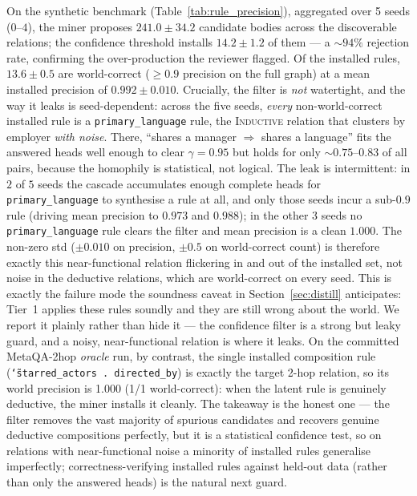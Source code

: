 \documentclass[11pt]{article}
\theoremstyle{plain}
\newcommand{\ruleProposed}{$241.0 \pm 34.2$}
\newcommand{\ruleInstalled}{$14.2 \pm 1.2$}
\newcommand{\ruleWorldCorrect}{$13.6 \pm 0.5$}
\newcommand{\ruleMeanPrec}{$0.992 \pm 0.010$}
\newcommand{\ruleSeeds}{5}
\newcommand{\oracleRuleInstalled}{1}
\newcommand{\oracleRuleWorldCorrect}{1}
\newcommand{\oracleRuleMeanPrec}{1.000}
\begin{document}
\begin{table}[t]
\centering
\caption{Rule-mining precision on the synthetic KGQA benchmark (mean $\pm$ std
over \ruleSeeds{} seeds, $300$-query workload, oracle teacher). The confidence
filter is selective (${\sim}14$ of ${\sim}241$ candidates installed) and mostly
--- but not perfectly --- world-correct.}
\label{tab:rule_precision}

\end{table}

On the synthetic benchmark (Table~\ref{tab:rule_precision}), aggregated over
\ruleSeeds{} seeds ($0$--$4$), the miner proposes \ruleProposed{} candidate
bodies across the discoverable relations; the confidence threshold installs
\ruleInstalled{} of them --- a ${\sim}94\%$ rejection rate, confirming the
over-production the reviewer flagged. Of the installed rules, \ruleWorldCorrect{}
are world-correct ($\ge 0.9$ precision on the full graph) at a mean installed
precision of \ruleMeanPrec{}. Crucially, the filter is \emph{not} watertight, and
the way it leaks is seed-dependent: across the five seeds, \emph{every}
non-world-correct installed rule is a \texttt{primary\_language} rule, the
\textsc{Inductive} relation that clusters by employer \emph{with noise}. There,
``shares a manager $\Rightarrow$ shares a language'' fits the answered heads
well enough to clear $\gamma{=}0.95$ but holds for only ${\sim}0.75$--$0.83$ of
all pairs, because the homophily is statistical, not logical. The leak is
intermittent: in $2$ of $5$ seeds the cascade accumulates enough complete heads
for \texttt{primary\_language} to synthesise a rule at all, and only those seeds
incur a sub-$0.9$ rule (driving mean precision to $0.973$ and $0.988$); in the
other $3$ seeds no \texttt{primary\_language} rule clears the filter and mean
precision is a clean $1.000$. The non-zero std ($\pm 0.010$ on precision,
$\pm 0.5$ on world-correct count) is therefore exactly this near-functional
relation flickering in and out of the installed set, not noise in the deductive
relations, which are world-correct on every seed. This is exactly the failure
mode the soundness caveat in Section~\ref{sec:distill} anticipates: Tier~1
applies these rules soundly and they are still wrong about the world. We report
it plainly rather than hide it --- the confidence filter is a strong but leaky
guard, and a noisy, near-functional relation is where it leaks. On the
committed MetaQA-2hop \emph{oracle} run, by contrast, the single installed
composition rule (\texttt{\char`\~starred\_actors\,.\,directed\_by}) is exactly
the target 2-hop relation, so its world precision is
\oracleRuleMeanPrec{} (\oracleRuleWorldCorrect{}/\oracleRuleInstalled{}
world-correct): when the latent rule is genuinely deductive, the miner installs
it cleanly. The takeaway is the honest one --- the filter removes the vast
majority of spurious candidates and recovers genuine deductive compositions
perfectly, but it is a statistical confidence test, so on relations with
near-functional noise a minority of installed rules generalise imperfectly;
correctness-verifying installed rules against held-out data (rather than only
the answered heads) is the natural next guard.
\end{document}
